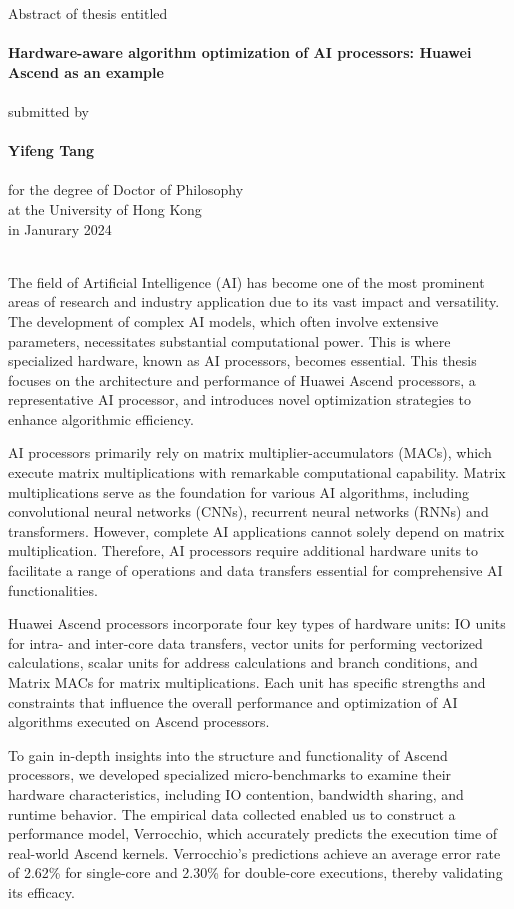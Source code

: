 \centering
Abstract of thesis entitled\\
~\\
{\Large \bf 
    Hardware-aware algorithm optimization of AI processors: Huawei Ascend as an example
}\\
~\\
submitted by\\
~\\
{\Large \bf Yifeng Tang}\\
~\\
for the degree of Doctor of Philosophy\\
at the University of Hong Kong\\
in Janurary 2024\\
~\\
\justifying

The field of Artificial Intelligence (AI) has become one of the most prominent areas of research and industry application due to its vast impact and versatility. The development of complex AI models, which often involve extensive parameters, necessitates substantial computational power. This is where specialized hardware, known as AI processors, becomes essential. This thesis focuses on the architecture and performance of Huawei Ascend processors, a representative AI processor, and introduces novel optimization strategies to enhance algorithmic efficiency.

AI processors primarily rely on matrix multiplier-accumulators (MACs), which execute matrix multiplications with remarkable computational capability. Matrix multiplications serve as the foundation for various AI algorithms, including convolutional neural networks (CNNs), recurrent neural networks (RNNs) and transformers. However, complete AI applications cannot solely depend on matrix multiplication. Therefore, AI processors require additional hardware units to facilitate a range of operations and data transfers essential for comprehensive AI functionalities.

Huawei Ascend processors incorporate four key types of hardware units: IO units for intra- and inter-core data transfers, vector units for performing vectorized calculations, scalar units for address calculations and branch conditions, and Matrix MACs for matrix multiplications. Each unit has specific strengths and constraints that influence the overall performance and optimization of AI algorithms executed on Ascend processors.

To gain in-depth insights into the structure and functionality of Ascend processors, we developed specialized micro-benchmarks to examine their hardware characteristics, including IO contention, bandwidth sharing, and runtime behavior. The empirical data collected enabled us to construct a performance model, Verrocchio, which accurately predicts the execution time of real-world Ascend kernels. Verrocchio's predictions achieve an average error rate of 2.62\% for single-core and 2.30\% for double-core executions, thereby validating its efficacy.

